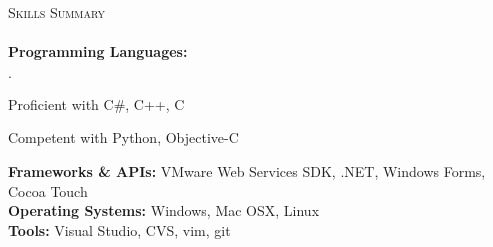 \documentclass[11pt]{article}
\newcommand{\mydot}{$\cdot$ }
\newcommand{\lineunder}{\vspace*{-8pt} \\ \hspace*{-18pt} \hrulefill \\}
\newcommand{\header}[1]{{\hspace*{-15pt}\vspace*{6pt} \textsc{#1}} \vspace*{-6pt} \lineunder}
\newenvironment{achievements}{\begin{list}{\mydot}{\topsep 0pt \itemsep -2pt}}{\vspace*{4pt}\end{list}}
\begin{document}

\header{Skills Summary}
\textbf{Programming Languages:} 
\begin{achievements}
  \item Proficient with C\#, C++, C
  \item Competent with Python, Objective-C
\end{achievements}
\vspace{-3pt}

\textbf{Frameworks \& APIs:} VMware Web Services SDK, .NET, Windows Forms, Cocoa Touch\\

\textbf{Operating Systems:} Windows, Mac OSX, Linux\\

\textbf{Tools:} Visual Studio, CVS, vim, git\\
\end{document}

